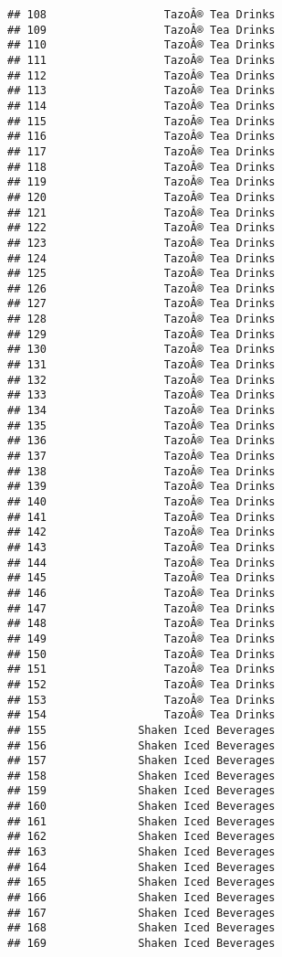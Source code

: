 \documentclass[
]{article}
\begin{document}
\begin{verbatim}
## 108                  TazoÂ® Tea Drinks
## 109                  TazoÂ® Tea Drinks
## 110                  TazoÂ® Tea Drinks
## 111                  TazoÂ® Tea Drinks
## 112                  TazoÂ® Tea Drinks
## 113                  TazoÂ® Tea Drinks
## 114                  TazoÂ® Tea Drinks
## 115                  TazoÂ® Tea Drinks
## 116                  TazoÂ® Tea Drinks
## 117                  TazoÂ® Tea Drinks
## 118                  TazoÂ® Tea Drinks
## 119                  TazoÂ® Tea Drinks
## 120                  TazoÂ® Tea Drinks
## 121                  TazoÂ® Tea Drinks
## 122                  TazoÂ® Tea Drinks
## 123                  TazoÂ® Tea Drinks
## 124                  TazoÂ® Tea Drinks
## 125                  TazoÂ® Tea Drinks
## 126                  TazoÂ® Tea Drinks
## 127                  TazoÂ® Tea Drinks
## 128                  TazoÂ® Tea Drinks
## 129                  TazoÂ® Tea Drinks
## 130                  TazoÂ® Tea Drinks
## 131                  TazoÂ® Tea Drinks
## 132                  TazoÂ® Tea Drinks
## 133                  TazoÂ® Tea Drinks
## 134                  TazoÂ® Tea Drinks
## 135                  TazoÂ® Tea Drinks
## 136                  TazoÂ® Tea Drinks
## 137                  TazoÂ® Tea Drinks
## 138                  TazoÂ® Tea Drinks
## 139                  TazoÂ® Tea Drinks
## 140                  TazoÂ® Tea Drinks
## 141                  TazoÂ® Tea Drinks
## 142                  TazoÂ® Tea Drinks
## 143                  TazoÂ® Tea Drinks
## 144                  TazoÂ® Tea Drinks
## 145                  TazoÂ® Tea Drinks
## 146                  TazoÂ® Tea Drinks
## 147                  TazoÂ® Tea Drinks
## 148                  TazoÂ® Tea Drinks
## 149                  TazoÂ® Tea Drinks
## 150                  TazoÂ® Tea Drinks
## 151                  TazoÂ® Tea Drinks
## 152                  TazoÂ® Tea Drinks
## 153                  TazoÂ® Tea Drinks
## 154                  TazoÂ® Tea Drinks
## 155              Shaken Iced Beverages
## 156              Shaken Iced Beverages
## 157              Shaken Iced Beverages
## 158              Shaken Iced Beverages
## 159              Shaken Iced Beverages
## 160              Shaken Iced Beverages
## 161              Shaken Iced Beverages
## 162              Shaken Iced Beverages
## 163              Shaken Iced Beverages
## 164              Shaken Iced Beverages
## 165              Shaken Iced Beverages
## 166              Shaken Iced Beverages
## 167              Shaken Iced Beverages
## 168              Shaken Iced Beverages
## 169              Shaken Iced Beverages

\end{verbatim}
\end{document}
